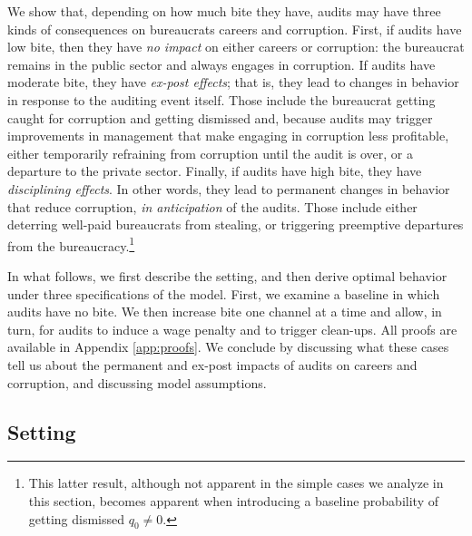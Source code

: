 \documentclass[12pt,a4paper]{article}
\theoremstyle{definition}
\begin{document}
We show that, depending on how much bite they have, audits may have three kinds of consequences on bureaucrats careers and corruption. First, if audits have low bite, then they have \emph{no impact} on either careers or corruption: the bureaucrat remains in the public sector and always engages in corruption. If audits have moderate bite, they have \emph{ex-post effects}; that is, they lead to changes in behavior in response to the auditing event itself. Those include the bureaucrat getting caught for corruption and getting dismissed and, because audits may trigger improvements in management that make engaging in corruption less profitable, either temporarily refraining from corruption until the audit is over, or a departure to the private sector. Finally, if audits have high bite, they have \emph{disciplining effects}. In other words, they lead to permanent changes in behavior that reduce corruption, \emph{in anticipation} of the audits. Those include either deterring well-paid bureaucrats from stealing, or triggering preemptive departures from the bureaucracy.\footnote{This latter result, although not apparent in the simple cases we analyze in this section, becomes apparent when introducing a baseline probability of getting dismissed $q_0 \neq 0$.}

In what follows, we first describe the setting, and then derive optimal behavior under three specifications of the model. First, we examine a baseline in which audits have no bite. We then increase bite one channel at a time and allow, in turn, for audits to induce a wage penalty and to trigger clean-ups. All proofs are available in Appendix \ref{app:proofs}. We conclude by discussing what these cases tell us about the permanent and ex-post impacts of audits on careers and corruption, and discussing model assumptions. 

\subsection{Setting}
\end{document}
